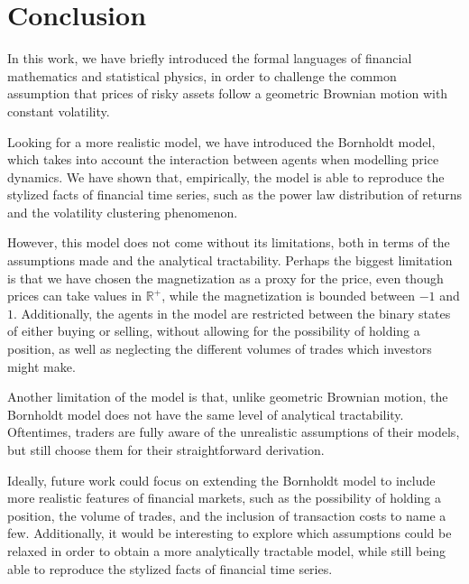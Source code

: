 \chapter{Conclusion}\label{ch:conclusion}
In this work, we have briefly introduced the formal languages of financial mathematics and statistical physics, in order to challenge the common assumption that prices of risky assets follow a geometric Brownian motion with constant volatility.

Looking for a more realistic model, we have introduced the Bornholdt model, which takes into account the interaction between agents when modelling price dynamics. We have shown that, empirically, the model is able to reproduce the stylized facts of financial time series, such as the power law distribution of returns and the volatility clustering phenomenon.

However, this model does not come without its limitations, both in terms of the assumptions made and the analytical tractability. Perhaps the biggest limitation is that we have chosen the magnetization as a proxy for the price, even though prices can take values in $\mathbb{R}^+$, while the magnetization is bounded between $-1$ and $1$. Additionally, the agents in the model are restricted between the binary states of either buying or selling, without allowing for the possibility of holding a position, as well as neglecting the different volumes of trades which investors might make.

Another limitation of the model is that, unlike geometric Brownian motion, the Bornholdt model does not have the same level of analytical tractability. Oftentimes, traders are fully aware of the unrealistic assumptions of their models, but still choose them for their straightforward derivation.

Ideally, future work could focus on extending the Bornholdt model to include more realistic features of financial markets, such as the possibility of holding a position, the volume of trades, and the inclusion of transaction costs to name a few. Additionally, it would be interesting to explore which assumptions could be relaxed in order to obtain a more analytically tractable model, while still being able to reproduce the stylized facts of financial time series.